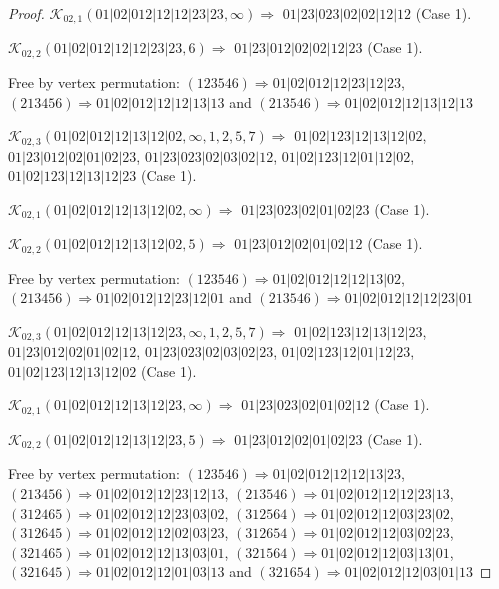 \documentclass[12pt]{article}
\theoremstyle{plain}
\theoremstyle{definition}
\theoremstyle{remark}
\newcommand{\fancy}[1]{\mathcal{#1}}
\def\K{\fancy{K}}
\begin{document}
\begin{proof}
	$\K_{02,1}(01|02|012|12|12|23|23,\infty)\Rightarrow $ $01|23|023|02|02|12|12$ (Case 1).
	
	$\K_{02,2}(01|02|012|12|12|23|23,6)\Rightarrow $ $01|23|012|02|02|12|23$ (Case 1).
	
	
	
	Free by vertex permutation: $(1 2 3 5 4 6)\Rightarrow 01|02|012|12|23|12|23$, $(2 1 3 4 5 6)\Rightarrow 01|02|012|12|12|13|13$ and $(2 1 3 5 4 6)\Rightarrow 01|02|012|12|13|12|13$
	
	
	
	\bigskip
	
	$\K_{02,3}(01|02|012|12|13|12|02,\infty,1, 2, 5, 7)\Rightarrow $ $01|02|123|12|13|12|02$, $01|23|012|02|01|02|23$, $01|23|023|02|03|02|12$, $01|02|123|12|01|12|02$, $01|02|123|12|13|12|23$ (Case 1).
	
	$\K_{02,1}(01|02|012|12|13|12|02,\infty)\Rightarrow $ $01|23|023|02|01|02|23$ (Case 1).
	
	$\K_{02,2}(01|02|012|12|13|12|02,5)\Rightarrow $ $01|23|012|02|01|02|12$ (Case 1).
	
	
	
	Free by vertex permutation: $(1 2 3 5 4 6)\Rightarrow 01|02|012|12|12|13|02$, $(2 1 3 4 5 6)\Rightarrow 01|02|012|12|23|12|01$ and $(2 1 3 5 4 6)\Rightarrow 01|02|012|12|12|23|01$
	
	
	
	\bigskip
	
	$\K_{02,3}(01|02|012|12|13|12|23,\infty,1, 2, 5, 7)\Rightarrow $ $01|02|123|12|13|12|23$, $01|23|012|02|01|02|12$, $01|23|023|02|03|02|23$, $01|02|123|12|01|12|23$, $01|02|123|12|13|12|02$ (Case 1).
	
	$\K_{02,1}(01|02|012|12|13|12|23,\infty)\Rightarrow $ $01|23|023|02|01|02|12$ (Case 1).
	
	$\K_{02,2}(01|02|012|12|13|12|23,5)\Rightarrow $ $01|23|012|02|01|02|23$ (Case 1).
	
	
	
	Free by vertex permutation: $(1 2 3 5 4 6)\Rightarrow 01|02|012|12|12|13|23$, $(2 1 3 4 5 6)\Rightarrow 01|02|012|12|23|12|13$, $(2 1 3 5 4 6)\Rightarrow 01|02|012|12|12|23|13$, $(3 1 2 4 6 5)\Rightarrow 01|02|012|12|23|03|02$, $(3 1 2 5 6 4)\Rightarrow 01|02|012|12|03|23|02$, $(3 1 2 6 4 5)\Rightarrow 01|02|012|12|02|03|23$, $(3 1 2 6 5 4)\Rightarrow 01|02|012|12|03|02|23$, $(3 2 1 4 6 5)\Rightarrow 01|02|012|12|13|03|01$, $(3 2 1 5 6 4)\Rightarrow 01|02|012|12|03|13|01$, $(3 2 1 6 4 5)\Rightarrow 01|02|012|12|01|03|13$ and $(3 2 1 6 5 4)\Rightarrow 01|02|012|12|03|01|13$
	

\end{proof}
\end{document}
